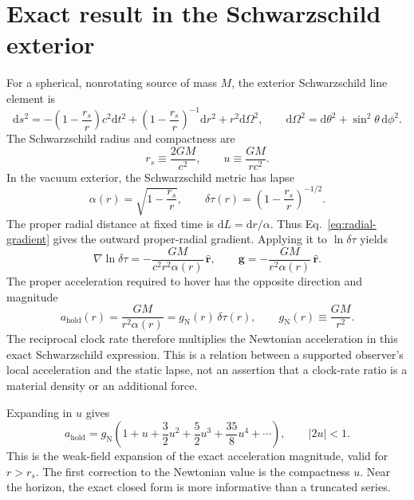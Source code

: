 \documentclass[12pt]{article}
\begin{document}
\section{Exact result in the Schwarzschild exterior}

For a spherical, nonrotating source of mass $M$, the exterior Schwarzschild line element is \cite{Schwarzschild,Wald,TaylorWheeler}
\begin{equation}
  \mathrm{d}s^2
  =-\left(1-\frac{r_s}{r}\right)c^2\mathrm{d}t^2
   +\left(1-\frac{r_s}{r}\right)^{-1}\mathrm{d}r^2
   +r^2\mathrm{d}\Omega^2,
  \qquad
  \mathrm{d}\Omega^2=\mathrm{d}\theta^2+\sin^2\theta\,\mathrm{d}\phi^2.
  \label{eq:schwarzschild-metric}
\end{equation}
The Schwarzschild radius and compactness are
\begin{equation}
  r_s\equiv\frac{2GM}{c^2},
  \qquad
  u\equiv\frac{GM}{rc^2}.
  \label{eq:schwarzschild-vars}
\end{equation}
In the vacuum exterior, the Schwarzschild metric has lapse
\begin{equation}
  \alpha(r)=\sqrt{1-\frac{r_s}{r}},
  \qquad
  \delta\tau(r)=\left(1-\frac{r_s}{r}\right)^{-1/2}.
  \label{eq:schwarzschild-rate}
\end{equation}
The proper radial distance at fixed time is $\mathrm{d}L=\mathrm{d}r/\alpha$. Thus Eq.~\eqref{eq:radial-gradient} gives the outward proper-radial gradient. Applying it to $\ln\delta\tau$ yields
\begin{equation}
  \nabla\ln\delta\tau
  =-\frac{GM}{c^2r^2\alpha(r)}\,\hat{\mathbf{r}},
  \qquad
  \boxed{\mathbf{g}
  =-\frac{GM}{r^2\alpha(r)}\,\hat{\mathbf{r}}.}
  \label{eq:schwarzschild-gradient}
\end{equation}
The proper acceleration required to hover has the opposite direction and magnitude
\begin{equation}
  a_{\mathrm{hold}}(r)
  =\frac{GM}{r^2\alpha(r)}
  =g_{\mathrm{N}}(r)\,\delta\tau(r),
  \qquad
  g_{\mathrm{N}}(r)\equiv\frac{GM}{r^2}.
  \label{eq:schwarzschild-hover}
\end{equation}
The reciprocal clock rate therefore multiplies the Newtonian acceleration in this exact Schwarzschild expression. This is a relation between a supported observer's local acceleration and the static lapse, not an assertion that a clock-rate ratio is a material density or an additional force.

Expanding in $u$ gives
\begin{equation}
  a_{\mathrm{hold}}
  =g_{\mathrm{N}}\left(
    1+u+\frac{3}{2}u^2+\frac{5}{2}u^3
      +\frac{35}{8}u^4+\cdots\right),
  \qquad |2u|<1.
  \label{eq:acceleration-series}
\end{equation}
This is the weak-field expansion of the exact acceleration magnitude, valid for $r>r_s$. The first correction to the Newtonian value is the compactness $u$. Near the horizon, the exact closed form is more informative than a truncated series.
\end{document}
